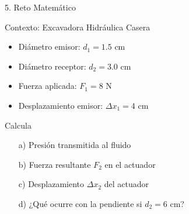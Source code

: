 \documentclass[aspectratio=169,11pt]{beamer}
\newcommand{\stepbeat}[2]{}
\begin{document}
\begin{frame}{5. Reto Matemático}
  \begin{block}{Contexto: Excavadora Hidráulica Casera}
    \begin{itemize}
      \item Diámetro emisor: $d_1 = 1.5$ cm
      \item Diámetro receptor: $d_2 = 3.0$ cm
      \item Fuerza aplicada: $F_1 = 8$ N
      \item Desplazamiento emisor: $\Delta x_1 = 4$ cm
    \end{itemize}
  \end{block}
  \only<1>{\stepbeat{frame_reto}{reto_datos}}

  \begin{exampleblock}{Calcula}
    \begin{enumerate}
      \item[a)] Presión transmitida al fluido
      \item[b)] Fuerza resultante $F_2$ en el actuador
      \item[c)] Desplazamiento $\Delta x_2$ del actuador
      \item[d)] ¿Qué ocurre con la pendiente si $d_2 = 6$ cm?
    \end{enumerate}
  \end{exampleblock}
  \only<2>{\stepbeat{frame_reto}{think_pause}}

  \only<3>{\stepbeat{frame_reto}{reto_solucion}}
\end{frame}
\end{document}
